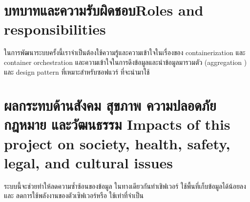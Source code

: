 \section{\ifcpe บทบาทและความรับผิดชอบ\else Roles and responsibilities\fi}
ในการพัฒนาระบบครั้งนี้เราจำเป็นต้องใช้ความรู้และความเข้าใจในเรื่องของ containerization \cite{containerization} และ container orchestration \cite{orchestration} และความเข้าใจในการดึงข้อมูลและนำข้อมูลมารวมตัว (aggregation \cite{aggregation}) และ design pattern ที่เหมาะสำหรับซอฟแวร์ ที่จะนำมาใช้

\section{\ifcpe%
ผลกระทบด้านสังคม สุขภาพ ความปลอดภัย กฎหมาย และวัฒนธรรม
\else%
Impacts of this project on society, health, safety, legal, and cultural issues
\fi}

ระบบนี้จะช่วยทำให้ลดความซ้ำซ้อนของข้อมูล ในทางเดียวกันทำเชิฟเวอร์ ใช้พื้นที่เก็บข้อมูลได้น้อยลง และ ลดการใช้พลังงานของตัวเซิฟเวอร์หรือ ใช้เท่าที่จำเป็น